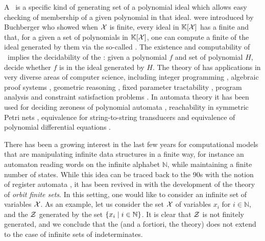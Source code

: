 \documentclass[11pt,a4paper,twosided]{article}
\theoremstyle{definition}
\newcommand{\Grbs}{\kl{Gröbner bases}}
\newcommand{\Grb}{\kl{Gröbner basis}}
\newcommand{\N}{\mathbb{N}}
\newcommand{\K}{\mathbb{K}}
\newcommand{\poly}[2]{#1[#2]}
\begin{document}
\AP A \Grb\ is a specific kind of generating set of a polynomial ideal
which allows easy checking of membership of a given polynomial in that ideal.
 were introduced by Buchberger who showed when $\mathcal{X}$ is
finite, every ideal in $\poly{\K}{\Indets}$ has a finite  and
that, for a given a set of polynomials in $\poly{\K}{\Indets}$, one can compute a
finite  of the ideal generated by them via the so-called
 \cite{BUCH76}. The
existence and computability of \Grbs\ implies the decidability of the
: given a polynomial $f$ and set of polynomial
$H$, decide whether $f$ is in the ideal generated by $H$. The theory of
 has applications in very diverse areas of computer
science, including integer programming \cite{Sturmfels96}, algebraic proof
systems \cite{algProof}, geometric reasoning \cite{Cox2015chGeom}, fixed
parameter tractability \cite{ACDM22}, program analysis \cite{SSM04} and
constraint satisfaction problems \cite{Mas21}.
In automata theory it has been used for deciding zeroness of polynomial
automata \cite{BEDUSHWO17}, reachability in symmetric Petri nets \cite{MAME82},
equivalence for string-to-string transducers \cite{HONKALA00} and equivalence
of polynomial differential equations \cite{CLEMENTE24}. 

\AP There has been a growing interest in the last few years for computational
models that are manipulating infinite data structures in a finite way, for
instance an automaton reading words on the infinite alphabet $\N$, while
maintaining a finite number of states. While this idea can be traced back to
the 90s with the notion of register automata \cite{KAFR94}, it has been revived
in with the development of the theory of \emph{orbit finite sets}. In this
setting, one would like to consider an infinite set of variables $\mathcal{X}$. As an
example, let us consider the set $\mathcal{X}$ of variables $x_i$ for $i \in \N$, and
the  $\mathcal{Z}$ generated by the set $\setof{x_i}{i \in \N}$. It is
clear that $\mathcal{Z}$ is not finitely generated, and we conclude that the
 (and a fortiori, the 
theory) does not extend to the case of infinite sets of indeterminates.
\end{document}
